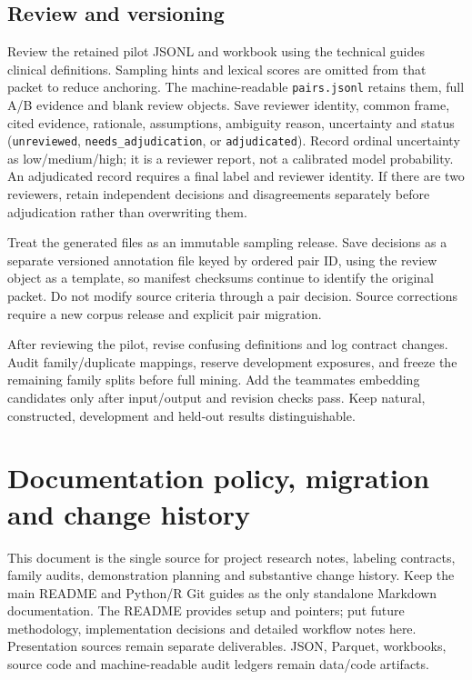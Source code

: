 \documentclass[10pt,letterpaper]{article}
\newcommand{\pathcode}[1]{\nolinkurl{#1}}
\begin{document}
\subsection{Review and versioning}\label{contract01-review-and-versioning}

Review the retained pilot JSONL and workbook using the technical guide\textquotesingle s clinical definitions. Sampling hints and lexical scores are omitted from that packet to reduce anchoring. The machine-readable \pathcode{pairs.jsonl} retains them, full A/B evidence and blank review objects. Save reviewer identity, common frame, cited evidence, rationale, assumptions, ambiguity reason, uncertainty and status (\pathcode{unreviewed}, \pathcode{needs_adjudication}, or \pathcode{adjudicated}). Record ordinal uncertainty as low/medium/high; it is a reviewer report, not a calibrated model probability. An adjudicated record requires a final label and reviewer identity. If there are two reviewers, retain independent decisions and disagreements separately before adjudication rather than overwriting them.

Treat the generated files as an immutable sampling release. Save decisions as a separate versioned annotation file keyed by ordered pair ID, using the review object as a template, so manifest checksums continue to identify the original packet. Do not modify source criteria through a pair decision. Source corrections require a new corpus release and explicit pair migration.

After reviewing the pilot, revise confusing definitions and log contract changes. Audit family/duplicate mappings, reserve development exposures, and freeze the remaining family splits before full mining. Add the teammate\textquotesingle s embedding candidates only after input/output and revision checks pass. Keep natural, constructed, development and held-out results distinguishable.


\clearpage
\section{Documentation policy, migration and change history}
\label{sec:documentationpolicy}
This document is the single source for project research notes, labeling
contracts, family audits, demonstration planning and substantive change
history. Keep the main README and Python/R Git guides as the only standalone
Markdown documentation. The README provides setup and pointers; put future
methodology, implementation decisions and detailed workflow notes here.
Presentation sources remain separate deliverables. JSON, Parquet, workbooks,
source code and machine-readable audit ledgers remain data/code artifacts.
\end{document}
